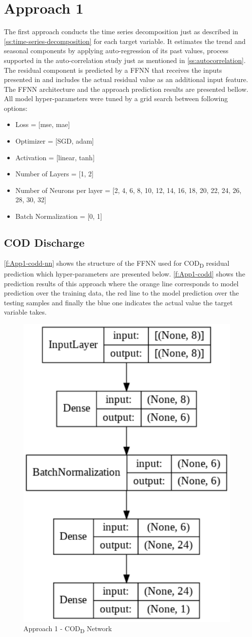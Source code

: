 \section{Approach 1}
\label{s:resutls-approach1}
The first approach conducts the time series decomposition just as described in \autoref{ss:time-series-decomposition} for each target variable. It estimates the trend and seasonal components by applying auto-regression of its past values, process supported in the auto-correlation study just as mentioned in \autoref{ss:autocorrelation}. The residual component is predicted by a \ac{FFNN} that receives the inputs presented in \label{s:results_data_selection} and includes the actual residual value as an additional input feature. The \ac{FFNN} architecture and the approach prediction results are presented bellow.
All model hyper-parameters were tuned by a grid search between following options:

\begin{itemize}
    \item Loss = [mse, mae]
    \item Optimizer = [SGD, adam]
    \item Activation = [linear, tanh]
    \item Number of Layers = [1, 2]
    \item Number of Neurons per layer = [2, 4, 6, 8, 10, 12, 14, 16, 18, 20, 22, 24, 26, 28, 30, 32]
    \item Batch Normalization = [0, 1]
\end{itemize}

\subsection{COD Discharge}
\autoref{f:App1-codd-nn} shows the structure of the \ac{FFNN} used for \ac{COD}\textsubscript{D} residual prediction which hyper-parameters are presented below. \autoref{f:App1-codd} shows the prediction results of this approach where the orange line corresponds to model prediction over the training data, the red line to the model prediction over the testing samples and finally the blue one indicates the actual value the target variable takes.

\begin{figure}[h]
\centering
\includegraphics[width=0.4\linewidth]{figures/Ch5/App1_CODeq.pdf}
\caption{Approach 1 - COD\textsubscript{D} Network}
\label{f:App1-codd-nn}
\end{figure}

